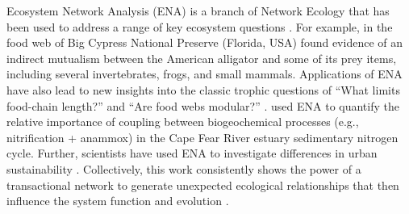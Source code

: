 \documentclass[11pt]{article}
\begin{document}
\begin{spacing}{2}

Ecosystem Network Analysis (ENA) is a branch of Network Ecology that
has been used to address a range of key ecosystem questions
\citep{borrett12_netecol, fath99_review, ulanowicz86}.
For example, in the food web of Big Cypress National Preserve
(Florida, USA) \citet{bondavalli99} found evidence of an indirect
mutualism between the American alligator and some of its prey items,
including several invertebrates, frogs, and small
mammals. Applications of ENA have also lead to new insights into the classic
trophic questions of ``What limits food-chain length?''
\citep{ulanowicz2014} and ``Are food webs modular?''  \citep{krause04,
  allesina05_scc, borrett07_jtb}.  \citet{hines12} used ENA to
quantify the relative importance of coupling between biogeochemical
processes (e.g., nitrification + anammox) in the Cape Fear River
estuary sedimentary nitrogen cycle.  Further, scientists have used
ENA to investigate differences in urban sustainability
\citep{bodini02, zhang10_ecomod, chen12, bodini2012cities}.
Collectively, this work consistently shows the power of a
transactional network to generate unexpected ecological relationships
that then influence the system function and evolution
\citep{ulanowicz97, patten91, jorgensen07_newecology}.



\end{spacing}
\end{document}

